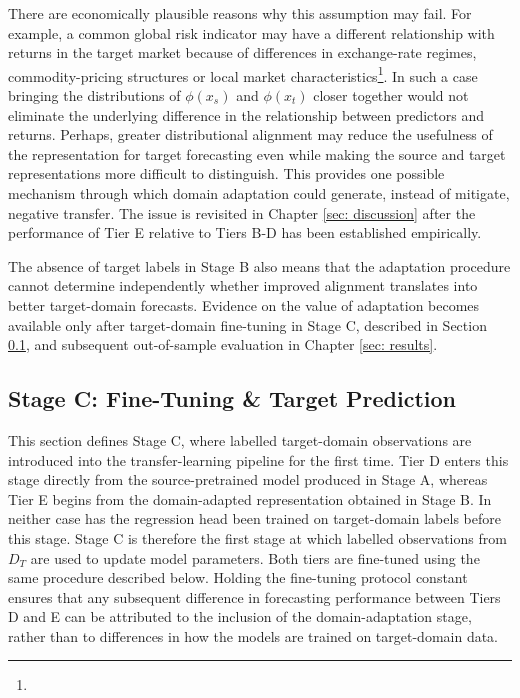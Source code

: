 There are economically plausible reasons why this assumption may fail. For example, a common global risk indicator may have a different relationship with returns in the target market because of differences in exchange-rate regimes, commodity-pricing structures or local market characteristics\footnote{}. In such a case bringing the distributions of $\phi(x_s)$ and $\phi(x_t)$ closer together would not eliminate the underlying difference in the relationship between predictors and returns. Perhaps, greater distributional alignment may reduce the usefulness of the representation for target forecasting even while making the source and target representations more difficult to distinguish. This provides one possible mechanism through which domain adaptation could generate, instead of mitigate, negative transfer. The issue is revisited in Chapter \ref{sec: discussion} after the performance of Tier E relative to Tiers B-D has been established empirically.

The absence of target labels in Stage B also means that the adaptation procedure cannot determine independently whether improved alignment translates into better target-domain forecasts. Evidence on the value of adaptation becomes available only after target-domain fine-tuning in Stage C, described in Section \ref{subsec: methodology_stage c}, and subsequent out-of-sample evaluation in Chapter \ref{sec: results}.

\subsection{Stage C: Fine-Tuning \& Target Prediction}  \label{subsec: methodology_stage c}
This section defines Stage C, where labelled target-domain observations are introduced into the transfer-learning pipeline for the first time. Tier D enters this stage directly from the source-pretrained model produced in Stage A, whereas Tier E begins from the domain-adapted representation obtained in Stage B. In neither case has the regression head been trained on target-domain labels before this stage. Stage C is therefore the first stage at which labelled observations from $D_T$ are used to update model parameters. Both tiers are fine-tuned using the same procedure described below. Holding the fine-tuning protocol constant ensures that any subsequent difference in forecasting performance between Tiers D and E can be attributed to the inclusion of the domain-adaptation stage, rather than to differences in how the models are trained on target-domain data.

